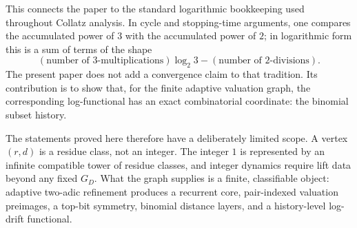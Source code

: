 \documentclass[11pt]{amsart}
\theoremstyle{definition}
\theoremstyle{remark}
\begin{document}
This connects the paper to the standard logarithmic bookkeeping used throughout Collatz analysis.  In cycle and stopping-time arguments, one compares the accumulated power of $3$ with the accumulated power of $2$; in logarithmic form this is a sum of terms of the shape
\[
(\text{number of }3\text{-multiplications})\log_2 3
-
(\text{number of }2\text{-divisions}).
\]
The present paper does not add a convergence claim to that tradition.  Its contribution is to show that, for the finite adaptive valuation graph, the corresponding log-functional has an exact combinatorial coordinate: the binomial subset history.

The statements proved here therefore have a deliberately limited scope.  A vertex $(r,d)$ is a residue class, not an integer.  The integer $1$ is represented by an infinite compatible tower of residue classes, and integer dynamics require lift data beyond any fixed $G_D$.  What the graph supplies is a finite, classifiable object: adaptive two-adic refinement produces a recurrent core, pair-indexed valuation preimages, a top-bit symmetry, binomial distance layers, and a history-level log-drift functional.
\end{document}
